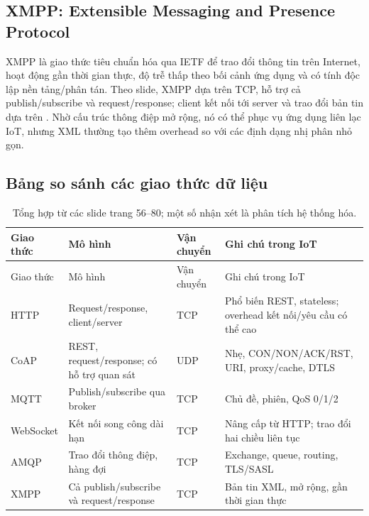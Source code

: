 \subsection{XMPP: Extensible Messaging and Presence Protocol}
XMPP là giao thức tiêu chuẩn hóa qua IETF để trao đổi thông tin trên Internet, hoạt động gần thời gian thực, độ trễ thấp theo bối cảnh ứng dụng và có tính độc lập nền tảng/phân tán. Theo slide, XMPP dựa trên TCP, hỗ trợ cả publish/subscribe và request/response; client kết nối tới server và trao đổi bản tin dựa trên . Nhờ cấu trúc thông điệp mở rộng, nó có thể phục vụ ứng dụng liên lạc IoT, nhưng XML thường tạo thêm overhead so với các định dạng nhị phân nhỏ gọn. 

\subsection{Bảng so sánh các giao thức dữ liệu}
\begingroup\footnotesize\sloppy\begin{longtable}{p{1.8cm}p{3.45cm}p{1.8cm}p{4.15cm}}
\caption{Tổng hợp từ các slide trang 56--80; một số nhận xét là phân tích hệ thống hóa.}\\
\toprule Giao thức & Mô hình & Vận chuyển & Ghi chú trong IoT\\\midrule\endfirsthead
\toprule Giao thức & Mô hình & Vận chuyển & Ghi chú trong IoT\\\midrule\endhead
HTTP & Request/response, client/server & TCP & Phổ biến REST, stateless; overhead kết nối/yêu cầu có thể cao\\
CoAP & REST, request/response; có hỗ trợ quan sát & UDP & Nhẹ, CON/NON/ACK/RST, URI, proxy/cache, DTLS\\
MQTT & Publish/subscribe qua broker & TCP & Chủ đề, phiên, QoS 0/1/2\\
WebSocket & Kết nối song công dài hạn & TCP & Nâng cấp từ HTTP; trao đổi hai chiều liên tục\\
AMQP & Trao đổi thông điệp, hàng đợi & TCP & Exchange, queue, routing, TLS/SASL\\
XMPP & Cả publish/subscribe và request/response & TCP & Bản tin XML, mở rộng, gần thời gian thực\\\bottomrule
\end{longtable}\endgroup

